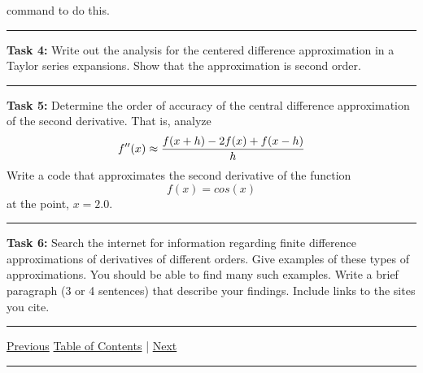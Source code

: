 \documentclass[10pt,fleqn]{article}
\begin{document}
\begin{trivlist}
\begin{verbatim}
        \end{verbatim}
        command to do this.
\vskip0.1in\hrule\vskip0.1in \noindent
  \item[\bf Task 4:] Write out the analysis for the centered difference
        approximation in a Taylor series expansions. Show that the approximation
        is second order.
\vskip0.1in\hrule\vskip0.1in \noindent
  \item[\bf Task 5:] Determine the order of accuracy of the central difference
        approximation of the second derivative. That is, analyze
        \[
          f''(x) \approx {{f(x+h) - 2 f(x) + f(x-h)}\over{h}}
        \]
        Write a code that approximates the second derivative of the function
        \[
          f(x) = cos(x)
        \] 
        at the point, \(x=2.0\).
\vskip0.1in\hrule\vskip0.1in \noindent
  \item[\bf Task 6:] Search the internet for information regarding finite
        difference approximations of derivatives of different orders. Give
        examples of these types of approximations. You should be able to find
        many such examples. Write a brief paragraph (3 or 4 sentences) that
        describe your findings. Include links to the sites you cite.
\end{trivlist}
\vskip0.1in\hrule\vskip0.1in \noindent
  \href{../../tasksheet_01/html/tasksheet_01.html}{Previous}
  \href{../../toc/md/tasksheet_toc.md}{Table of Contents} |
  \href{../../tasksheet_03/html/tasksheet_03.html}{Next}
\vskip0.1in\hrule\vskip0.1in \noindent
\end{document}
